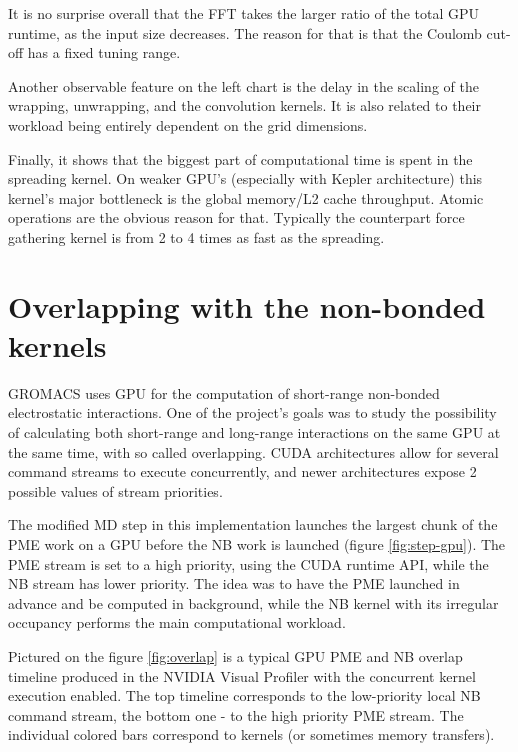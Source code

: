 \documentclass[12pt,a4paper]{report}
\newcommand{\draft}[1]{#1}
\begin{document}

It is no surprise overall that the FFT takes the larger ratio of the total GPU runtime, as the input size decreases. The reason for that is that the Coulomb cut-off has a fixed tuning range.

Another observable feature on the left chart is the delay in the scaling of the wrapping, unwrapping, and the convolution kernels. It is also related to their workload being entirely dependent on the grid dimensions.

Finally, it shows that the biggest part of computational time is spent in the spreading kernel. On weaker GPU's (especially with Kepler architecture) this kernel's major bottleneck is the global memory/L2 cache throughput. Atomic operations are the obvious reason for that. Typically the counterpart force gathering kernel  is from 2 to 4 times as fast as the spreading. 



\FloatBarrier
\section{Overlapping with the non-bonded kernels}\label{overlapped}

GROMACS uses GPU for the computation of short-range non-bonded electrostatic interactions. One of the project's goals was to study the possibility of calculating both short-range and long-range interactions on the same GPU at the same time, with so called overlapping. CUDA architectures allow for several command streams to execute concurrently, and newer architectures expose 2 possible values of stream priorities.

The modified MD step in this implementation launches the largest chunk of the PME work on a GPU before the NB work is launched (figure \ref{fig:step-gpu}). The PME stream is set to a high priority, using the CUDA runtime API, while the NB stream has lower priority. 
The idea was to have the PME launched in advance and be computed in background, while the NB kernel with its irregular occupancy performs the main computational workload.

Pictured on the figure \ref{fig:overlap} is a typical GPU PME and NB overlap timeline produced in the NVIDIA Visual Profiler with the concurrent kernel execution enabled.
The top timeline corresponds to the low-priority local NB command stream, the bottom one - to the high priority PME stream. The individual colored bars correspond to kernels (or sometimes memory transfers). 
\end{document}
